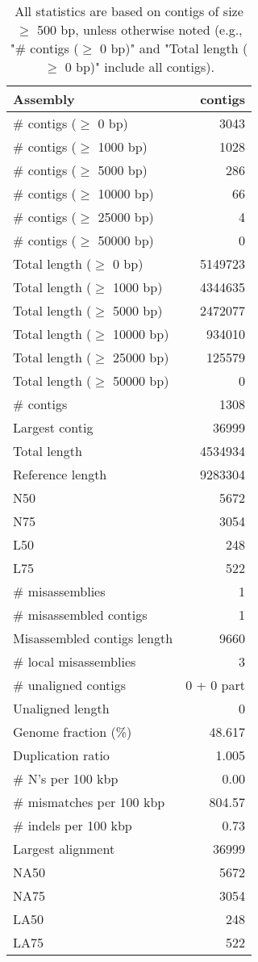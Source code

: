 \documentclass[12pt,a4paper]{article}
\begin{document}
\begin{table}[ht]
\begin{center}
\caption{All statistics are based on contigs of size $\geq$ 500 bp, unless otherwise noted (e.g., "\# contigs ($\geq$ 0 bp)" and "Total length ($\geq$ 0 bp)" include all contigs).}
\begin{tabular}{|l*{1}{|r}|}
\hline
Assembly & contigs \\ \hline
\# contigs ($\geq$ 0 bp) & 3043 \\ \hline
\# contigs ($\geq$ 1000 bp) & 1028 \\ \hline
\# contigs ($\geq$ 5000 bp) & 286 \\ \hline
\# contigs ($\geq$ 10000 bp) & 66 \\ \hline
\# contigs ($\geq$ 25000 bp) & 4 \\ \hline
\# contigs ($\geq$ 50000 bp) & 0 \\ \hline
Total length ($\geq$ 0 bp) & 5149723 \\ \hline
Total length ($\geq$ 1000 bp) & 4344635 \\ \hline
Total length ($\geq$ 5000 bp) & 2472077 \\ \hline
Total length ($\geq$ 10000 bp) & 934010 \\ \hline
Total length ($\geq$ 25000 bp) & 125579 \\ \hline
Total length ($\geq$ 50000 bp) & 0 \\ \hline
\# contigs & 1308 \\ \hline
Largest contig & 36999 \\ \hline
Total length & 4534934 \\ \hline
Reference length & 9283304 \\ \hline
N50 & 5672 \\ \hline
N75 & 3054 \\ \hline
L50 & 248 \\ \hline
L75 & 522 \\ \hline
\# misassemblies & 1 \\ \hline
\# misassembled contigs & 1 \\ \hline
Misassembled contigs length & 9660 \\ \hline
\# local misassemblies & 3 \\ \hline
\# unaligned contigs & 0 + 0 part \\ \hline
Unaligned length & 0 \\ \hline
Genome fraction (\%) & 48.617 \\ \hline
Duplication ratio & 1.005 \\ \hline
\# N's per 100 kbp & 0.00 \\ \hline
\# mismatches per 100 kbp & 804.57 \\ \hline
\# indels per 100 kbp & 0.73 \\ \hline
Largest alignment & 36999 \\ \hline
NA50 & 5672 \\ \hline
NA75 & 3054 \\ \hline
LA50 & 248 \\ \hline
LA75 & 522 \\ \hline
\end{tabular}
\end{center}
\end{table}
\end{document}
